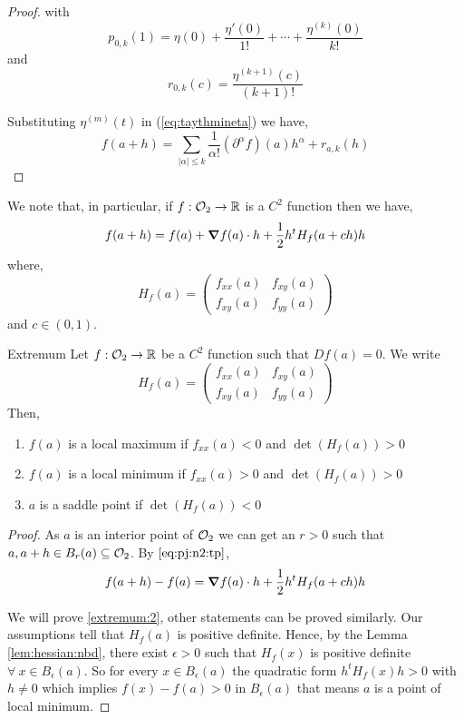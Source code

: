 \documentclass[../Analysis-3.tex]{subfiles}
\begin{document}
\begin{proof}
  with \begin{equation}
    p_{0,k}(1) = \eta(0) + \frac{\eta '(0)}{1!} + \cdots + \frac{\eta^{(k)}(0)}{k!}
  \end{equation} and
  \begin{equation}
    r_{0,k} (c) = \frac{\eta^{(k+1)}(c)}{(k+1)!}
  \end{equation}

  Substituting $\eta^{(m)}(t)$ in (\ref{eq:taythmineta}) we have,
  \[ f(a+h) = \sum_{| \alpha | \leq k } \frac{1}{\alpha !} ({\partial}^{\alpha} f ) (a) h^{\alpha} + r_{a,k} (h) \]
\end{proof}

We note that, in particular, if \( f: \mathcal{O}_{2} \to \mathbb{R} \) is a \( C^2 \) function then we have,
\begin{equation}\label{eq:pj:n2:tp}
  f(a+h) = f(a) + \grad f(a)\cdot h + \frac{1}{2}h^t H_f(a+ch)h
\end{equation} where,
\[ H_f(a) = \begin{pmatrix}
    f_{xx}(a) & f_{xy}(a) \\
    f_{xy}(a) & f_{yy}(a)
  \end{pmatrix} \]
and \( c \in (0,1) \).

\begin{Thm}{Extremum}{}
  Let $f : \mathcal{O}_{2} \to \mathbb{R}$ be a $C^2$ function such that $Df(a) = 0$. We write \[ H_f(a) =  \begin{pmatrix}
      f_{xx}(a) & f_{xy}(a) \\
      f_{xy}(a) & f_{yy}(a)
    \end{pmatrix} \]
  Then, \begin{enumerate}[label=(\roman*)]
    \item $f(a)$ is a local maximum if $f_{xx} (a) < 0$ and $\det (H_f(a)) > 0$
    \item $f(a)$ is a local minimum if $f_{xx} (a) > 0$ and $\det (H_f(a)) > 0$ \label{extremum:2}
    \item $a$ is a saddle point if $\det (H_f(a)) < 0$
  \end{enumerate}
\end{Thm}

\begin{proof}
  As $ a $ is an interior point of $ \mathcal{O}_{2} $ we can get an $ r > 0 $ such that $ a, a+h \in B_r(a) \subseteq \mathcal{O}_{2}$. By $\eqref{eq:pj:n2:tp}$, \[ f(a+h) - f(a) = \grad f(a) \cdot h + \frac{1}{2}h^t H_f(a+ch)h \]

  We will prove \ref{extremum:2}, other statements can be proved similarly. Our assumptions tell that $H_f(a)$ is positive definite. Hence, by the Lemma \ref{lem:hessian:nbd}, there exist $ \epsilon > 0 $ such that $H_f(x)$ is positive definite $\forall\ x \in B_{\epsilon}(a)$. So for every $ x \in B_{\epsilon}(a) $ the quadratic form $ h^t H_f(x) h > 0 $ with $ h \neq 0 $ which implies $ f(x) - f(a) > 0 $ in $ B_{\epsilon}(a) $ that means $a$ is a point of local minimum.
\end{proof}
\end{document}
